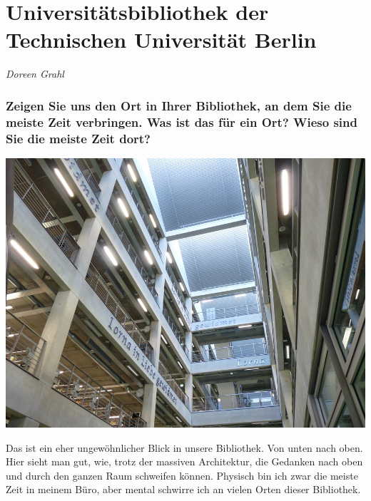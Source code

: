 
\vspace*{.5cm}
\section{Universitätsbibliothek der Technischen Universität Berlin}
\begin{center}
\emph{Doreen Grahl}
\end{center}
\vspace*{1cm}

\hypertarget{zeigen-sie-uns-den-ort-in-ihrer-bibliothek-an-dem-sie-die-meiste-zeit-verbringen.-was-ist-das-fuxfcr-ein-ort-wieso-sind-sie-die-meiste-zeit-dort}{%
\subsubsection*{Zeigen Sie uns den Ort in Ihrer Bibliothek, an dem Sie die
meiste Zeit verbringen. Was ist das für ein Ort? Wieso sind Sie die
meiste Zeit
dort?}\label{zeigen-sie-uns-den-ort-in-ihrer-bibliothek-an-dem-sie-die-meiste-zeit-verbringen.-was-ist-das-fuxfcr-ein-ort-wieso-sind-sie-die-meiste-zeit-dort}}

\begin{center}
\includegraphics{tu-berlin/img/Lichthof.jpg}
\end{center}

Das ist ein eher ungewöhnlicher Blick in unsere Bibliothek. Von unten
nach oben. Hier sieht man gut, wie, trotz der massiven Architektur, die
Gedanken nach oben und durch den ganzen Raum schweifen können. Physisch
bin ich zwar die meiste Zeit in meinem Büro, aber mental schwirre ich an
vielen Orten dieser Bibliothek.

